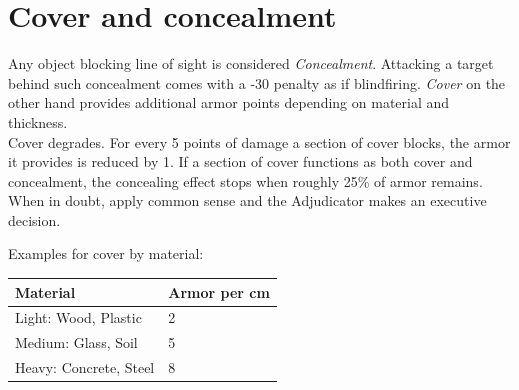 \section{Cover and concealment}
Any object blocking line of sight is considered \emph{Concealment}. Attacking a target behind such concealment comes with a -30 penalty as if blindfiring.
\emph{Cover} on the other hand provides additional armor points depending on material and thickness.
\\%
Cover degrades.
For every 5 points of damage a section of cover blocks,
	the armor it provides is reduced by 1.
If a section of cover functions as both cover and concealment,
	the concealing effect stops when roughly 25\% of armor remains.
When in doubt, apply common sense and the Adjudicator makes an executive decision.
\par
\needspace{30mm}
Examples for cover by material:
\par%
\vspace{-8mm}
\begin{tabular}{ll}
	Material & Armor per cm \\ \hline
	Light: Wood, Plastic & 2 \\
	Medium: Glass, Soil & 5 \\
	Heavy: Concrete, Steel & 8
\end{tabular}

